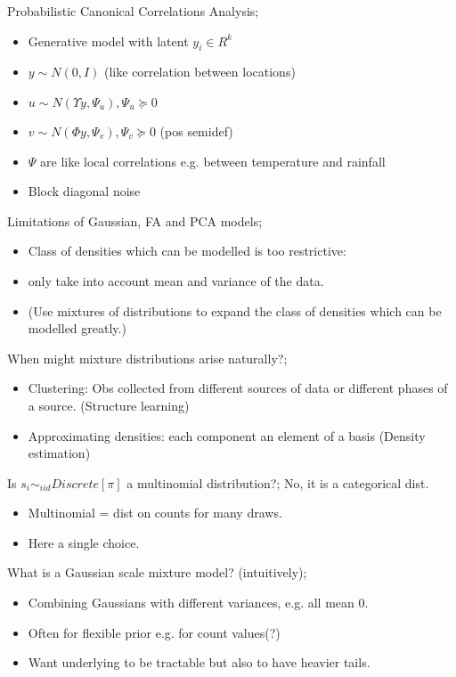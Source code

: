\documentclass{article}
\begin{document}
Probabilistic Canonical Correlations Analysis; \begin{itemize} \item Generative model with latent $y_i\in R^k$ \item $y\sim N(0,I)$ (like correlation between locations) \item $u\sim N(\Upsilon y, \Psi_u), \Psi_u \succeq 0$ \item $v\sim N(\Phi y, \Psi_v), \Psi_v \succeq 0$ (pos semidef) \item $\Psi$ are like local correlations e.g. between temperature and rainfall \item Block diagonal noise \end{itemize}

Limitations of Gaussian, FA and PCA models; \begin{itemize} \item Class of densities which can be modelled is too restrictive: \item only take into account mean and variance of the data.  \item (Use mixtures of distributions to expand the class of densities which can be modelled greatly.) \end{itemize}

When might mixture distributions arise naturally?; \begin{itemize} \item Clustering: Obs collected from different sources of data or different phases of a source. (Structure learning) \item Approximating densities: each component an element of a basis (Density estimation) \end{itemize}

Is $s_i\sim_{iid}Discrete[\pi]$ a multinomial distribution?; No, it is a categorical dist. \begin{itemize} \item Multinomial = dist on counts for many draws.  \item Here a single choice.  \end{itemize}

What is a Gaussian scale mixture model? (intuitively); \begin{itemize} \item Combining Gaussians with different variances, e.g. all mean 0.  \item Often for flexible prior e.g. for count values(?) \item Want underlying to be tractable but also to have heavier tails.  \end{itemize}
\end{document}
